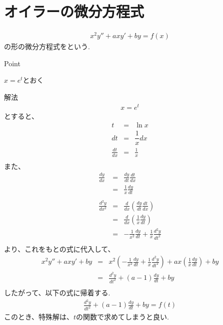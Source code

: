 \documentclass[a4paper]{jsarticle}
\begin{document}
\section{オイラーの微分方程式}
\begin{eqnarray*}
    x^2y''+axy'+by=f\left(x\right)
\end{eqnarray*}
の形の微分方程式をという.
\begin{itembox}[l]{Point}
    \begin{center}
        $x=e^t$とおく
    \end{center}
\end{itembox}
\begin{itembox}[l]{解法}
    \begin{eqnarray*}
        x=e^t
    \end{eqnarray*}
    とすると、
    \begin{eqnarray*}
        t&=&\ln x\\
        dt&=&\dfrac{1}{x}dx\\
        \frac{dt}{dx}&=&\frac{1}{x}\\
    \end{eqnarray*}
    また、
    \begin{eqnarray*}
        \frac{dy}{dx}&=&\frac{dy}{dt}\frac{dt}{dx}\\
        &=&\frac{1}{x}\frac{dy}{dt}\\
        \\
        \frac{d^2y}{dx^2}&=&\frac{d}{dx}\left(\frac{dy}{dt}\frac{dt}{dx}\right)\\
        &=&\frac{d}{dx}\left(\frac{1}{x}\frac{dy}{dt}\right)\\
        &=&-\frac{1}{x^2}\frac{dy}{dt}+\frac{1}{x}\frac{d^2y}{dt^2}\\
    \end{eqnarray*}
    より、これをもとの式に代入して、
    \begin{eqnarray*}
        x^2y''+axy'+by
        &=&x^2\left(-\frac{1}{x^2}\frac{dy}{dt}+\frac{1}{x}\frac{d^2y}{dt^2}\right)+ax\left(\frac{1}{x}\frac{dy}{dt}\right)+by\\
        &=&\frac{d^2y}{dt^2}+\left(a-1\right)\frac{dy}{dt}+by\\
    \end{eqnarray*}
    したがって、以下の式に帰着する.
    \begin{eqnarray*}
        \frac{d^2y}{dt^2}+\left(a-1\right)\frac{dy}{dt}+by=f\left(t\right)
    \end{eqnarray*}
    このとき、特殊解は、$t$の関数で求めてしまうと良い.
\end{itembox}
\end{document}

